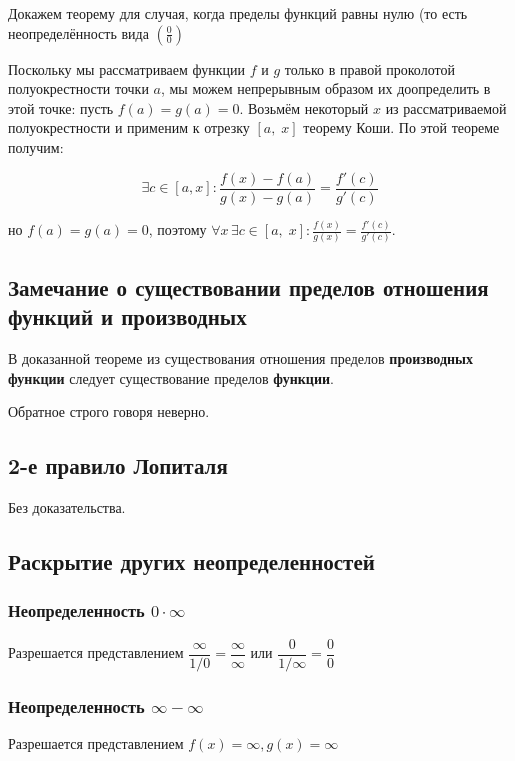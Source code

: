 Докажем теорему для случая, когда пределы функций равны нулю (то есть неопределённость вида $\left(\frac{0}{0}\right)$

Поскольку мы рассматриваем функции $f$ и $g$ только в правой проколотой полуокрестности точки $a$, мы можем непрерывным образом их доопределить в этой точке: пусть $f(a)=g(a)=0$. Возьмём некоторый $x$ из рассматриваемой полуокрестности и применим к отрезку $[a,\;x]$ теорему Коши. По этой теореме получим:

$$
\exists c \in [a,x]\!:\frac{f(x)-f(a)}{g(x)-g(a)}=\frac{f'(c)}{g'(c)}
$$

но $f(a)=g(a)=0$, поэтому $\forall x\, \exists c \in [a,\;x]\!:\frac{f(x)}{g(x)}=\frac{f'(c)}{g'(c)}$.

\subsection{Замечание о существовании пределов отношения функций и производных}

В доказанной теореме из существования отношения пределов \textbf{производных функции} 
следует существование пределов \textbf{функции}.

Обратное строго говоря неверно.


\subsection{2-е правило Лопиталя}

Без доказательства.

\subsection{Раскрытие других неопределенностей}

\subsubsection{Неопределенность $ 0 \cdot \infty $}

Разрешается представлением $ \dfrac{\infty}{1/0} = \dfrac{\infty}{\infty}
$ или $ \dfrac{0}{1/\infty} = \dfrac{0}{0}$

\subsubsection{Неопределенность $ \infty - \infty  $}

Разрешается представлением 
$ f(x)= \infty, g(x) = \infty$

